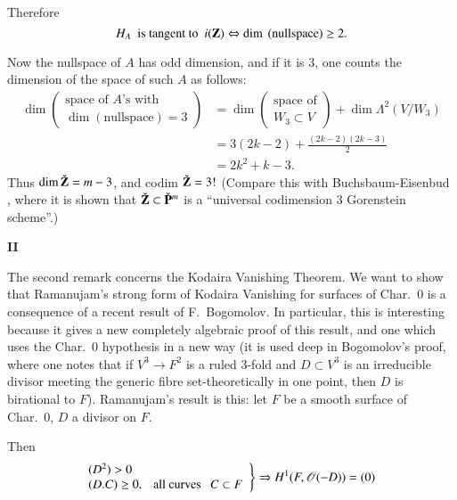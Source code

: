 Therefore\pageoriginale
$$
H_{A}\text{~ is tangent to~ }
i(\mathbf{Z})\Leftrightarrow\dim~ \text{(nullspace)} \geq 2.
$$

Now the nullspace of $A$ has odd dimension, and if it is 3, one counts
the dimension of the space of such $A$ as follows:
\begin{align*}
\dim \left(\begin{array}{l} \text{space of $A$'s
with}\\ \dim(\text{nullspace})=3\end{array}\right) &= \dim 
\left(\begin{array}{c} \text{space of}\\ W_{3}\subset
V\end{array}\right)+\dim \Lambda^{2}(V/W_{3})\\[7pt]
&= 3(2k-2)+\frac{(2k-2)(2k-3)}{2}\\
&= 2k^{2}+k-3.
\end{align*}
Thus $\dim \check{\mathbf{Z}}=m-3$, and codim $\check{\mathbf{Z}}=3!$ (Compare this with
Buchsbaum-Eisenbud \cite{art01-key3}, where it is shown that
$\check{\mathbf{Z}}\subset \check{\mathbf{P}}^{m}$ is a ``universal codimension 3
Gorenstein scheme''.)

\bigskip
\begin{center}
{\large\bf II}
\end{center}
\smallskip

The second remark concerns the Kodaira Vanishing Theorem. We want to
show that Ramanujam's strong form of Kodaira Vanishing for surfaces of
Char.~0 is a consequence of a recent result of F.~Bogomolov. In
particular, this is interesting because it gives a new completely
algebraic proof of this result, and one which uses the Char.~0
hypothesis in a new way (it is used deep in Bogomolov's proof, where
one notes that if $V^{3}\to F^{2}$ is a ruled 3-fold and $D\subset
V^{3}$ is an irreducible divisor meeting the generic fibre
set-theoretically in one point, then $D$ is birational to
$F$). Ramanujam's result \cite{art01-key11} is this: let $F$ be a
smooth surface of Char.~0, $D$ a divisor on $F$.

Then
\begin{equation}
\left.
\begin{array}{@{}l}
(D^{2})>0\\
(D.C)\geq 0,\text{~~ all curves~~ } C\subset F
\end{array}
\right\}
\Rightarrow H^{1}(F,\mathscr{O}(-D))=(0)\label{art01-1}
\end{equation}

